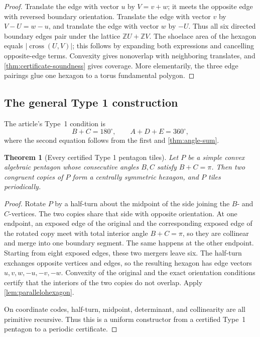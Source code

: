 \documentclass[11pt]{article}
\newtheorem{theorem}{Theorem}[section]
\theoremstyle{remark}
\newcommand{\Z}{\mathbb Z}
\newcommand{\cross}{\operatorname{cross}}
\begin{document}
\begin{proof}
Translate the edge with vector \(u\) by \(V=v+w\); it meets the opposite
edge with reversed boundary orientation.  Translate the edge with vector
\(v\) by \(V-U=w-u\), and translate the edge with vector \(w\) by \(-U\).
Thus all six directed boundary edges pair under the lattice
\(\Z U+\Z V\).  The shoelace area of the hexagon equals
\(|\cross(U,V)|\); this follows by expanding both expressions and cancelling
opposite-edge terms.  Convexity gives nonoverlap with neighboring translates,
and \cref{thm:certificate-soundness} gives coverage.  More elementarily, the
three edge pairings glue one hexagon to a torus fundamental polygon.
\end{proof}

\subsection{The general Type 1 construction}

The article's Type~1 condition is
\[
 B+C=180^\circ,
 \qquad A+D+E=360^\circ,
\]
where the second equation follows from the first and
\cref{thm:angle-sum}.

\begin{theorem}[Every certified Type 1 pentagon tiles]
\label{thm:type1-general}
Let \(P\) be a simple convex algebraic pentagon whose consecutive angles
\(B,C\) satisfy \(B+C=\pi\).  Then two congruent copies of \(P\) form a
centrally symmetric hexagon, and \(P\) tiles periodically.
\end{theorem}

\begin{proof}
Rotate \(P\) by a half-turn about the midpoint of the side joining the
\(B\)- and \(C\)-vertices.  The two copies share that side with opposite
orientation.  At one endpoint, an exposed edge of the original and the
corresponding exposed edge of the rotated copy meet with total interior angle
\(B+C=\pi\), so they are collinear and merge into one boundary segment.  The
same happens at the other endpoint.  Starting from eight exposed edges, these
two mergers leave six.  The half-turn exchanges opposite vertices and edges,
so the resulting hexagon has edge vectors
\(u,v,w,-u,-v,-w\).  Convexity of the original and the exact orientation
conditions certify that the interiors of the two copies do not overlap.
Apply \cref{lem:parallelohexagon}.

On coordinate codes, half-turn, midpoint, determinant, and collinearity are all
primitive recursive.  Thus this is a uniform constructor from a certified
Type~1 pentagon to a periodic certificate.
\end{proof}
\end{document}
